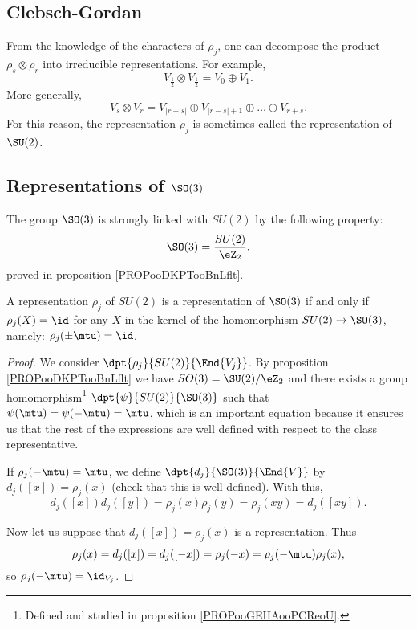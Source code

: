 \subsection{Clebsch-Gordan}

From the knowledge of the characters of $\rho_j$, one can decompose the product $\rho_s\otimes\rho_r$ into irreducible representations. For example,
\[
   V_{\frac{1}{2}}\otimes V_{\frac{1}{2}}=V_0\oplus V_1.
\]
More generally,
\begin{equation}
  V_s\otimes V_r=V_{|r-s|} \oplus V_{|r-s|+1}\oplus\ldots\oplus V_{r+s}.
\end{equation}
For this reason, the representation $\rho_j$ is sometimes called the  representation of $\SU(2)$.

\subsection{Representations of \texorpdfstring{$\SO(3)$}{SO3}}\label{pg:reprez_SOt}

The group $\SO(3)$ is strongly linked with $SU(2)$ by the following property:
\begin{equation}
   \SO(3)=\frac{SU(2)}{\eZ_2}.
\end{equation}
proved in proposition \ref{PROPooDKPTooBnLflt}.

\begin{lemma}\label{lem:SO_3}
    A representation $\rho_j$ of $SU(2)$ is a representation of $\SO(3)$ if and only if $\rho_j(X)=\id$ for any $X$ in the kernel of the homomorphism $SU(2)\to \SO(3)$, namely: $\rho_j(\pm\mtu)=\id$.
\end{lemma}

\begin{proof}
    We consider $\dpt{\rho_j}{SU(2)}{\End{V_j}}$. By proposition \ref{PROPooDKPTooBnLflt} we have \( SO(3)=\SU(2)/\eZ_2\) and there exists a group homomorphism\footnote{Defined and studied in proposition \ref{PROPooGEHAooPCReoU}.} $\dpt{\psi}{SU(2)}{\SO(3)}$ such that $\psi(\mtu)=\psi(-\mtu)=\mtu$, which is an important equation because it ensures us that the rest of the expressions are well defined with respect to the class representative.

    If $\rho_j(-\mtu)=\mtu$, we define $\dpt{d_j}{\SO(3)}{\End{V}}$ by $d_j([x])=\rho_j(x)$ (check that this is well defined). With this,
    \[
      d_j([x])d_j([y])=\rho_j(x)\rho_j(y)=\rho_j(xy)=d_j([xy]).
    \]

    Now let us suppose that $d_j([x])=\rho_j(x)$ is a representation. Thus
    \[
      \rho_j(x)=d_j([x])=d_j([-x])=\rho_j(-x)=\rho_j(-\mtu)\rho_j(x),
    \]
    so $\rho_j(-\mtu)=\id_{V_j}$.

\end{proof}

